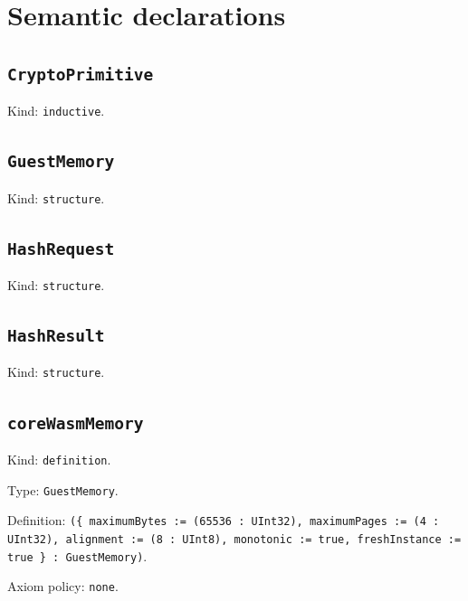 \documentclass[11pt]{article}
\begin{document}
\section*{Semantic declarations}
\subsection*{\texttt{CryptoPrimitive}}
\noindent Kind: \texttt{inductive}.\par
\subsection*{\texttt{GuestMemory}}
\noindent Kind: \texttt{structure}.\par
\subsection*{\texttt{HashRequest}}
\noindent Kind: \texttt{structure}.\par
\subsection*{\texttt{HashResult}}
\noindent Kind: \texttt{structure}.\par
\subsection*{\texttt{coreWasmMemory}}
\noindent Kind: \texttt{definition}.\par
\noindent Type: \texttt{GuestMemory}.\par
\noindent Definition: \texttt{(\{ maximumBytes := (65536 : UInt32), maximumPages := (4 : UInt32), alignment := (8 : UInt8), monotonic := true, freshInstance := true \} : GuestMemory)}.\par
\noindent Axiom policy: \texttt{none}.\par
\end{document}
